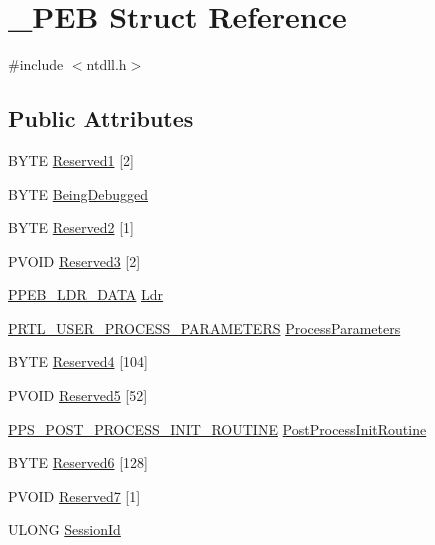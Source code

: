 \section{\-\_\-\-P\-E\-B Struct Reference}
\label{struct___p_e_b}


{\ttfamily \#include $<$ntdll.\-h$>$}

\subsection*{Public Attributes}
\begin{DoxyCompactItemize}
\item 
B\-Y\-T\-E \hyperlink{struct___p_e_b_af5f5296dcf3c0c893feb20369e5ee6ee}{Reserved1} \mbox{[}2\mbox{]}
\item 
B\-Y\-T\-E \hyperlink{struct___p_e_b_a6a1be595a75834747b84156ad490ac34}{Being\-Debugged}
\item 
B\-Y\-T\-E \hyperlink{struct___p_e_b_a631e09016e2625615dd0a4594fce4243}{Reserved2} \mbox{[}1\mbox{]}
\item 
P\-V\-O\-I\-D \hyperlink{struct___p_e_b_aa942177e7ede75e22d65547069f9fd65}{Reserved3} \mbox{[}2\mbox{]}
\item 
\hyperlink{ntdll_8h_a7199222ba5dc3b554125d875b4963b34}{P\-P\-E\-B\-\_\-\-L\-D\-R\-\_\-\-D\-A\-T\-A} \hyperlink{struct___p_e_b_a29c84508296ee2568339d06368fbaf70}{Ldr}
\item 
\hyperlink{ntdll_8h_aa9c2384887babd1a277b8e0ef36f0085}{P\-R\-T\-L\-\_\-\-U\-S\-E\-R\-\_\-\-P\-R\-O\-C\-E\-S\-S\-\_\-\-P\-A\-R\-A\-M\-E\-T\-E\-R\-S} \hyperlink{struct___p_e_b_a92dea8b624fff855a19206b16a642bc4}{Process\-Parameters}
\item 
B\-Y\-T\-E \hyperlink{struct___p_e_b_a981f5b2756598e2c4f5b90c94d686467}{Reserved4} \mbox{[}104\mbox{]}
\item 
P\-V\-O\-I\-D \hyperlink{struct___p_e_b_a1a2f1fdc366fd4e789973c4e179a09b3}{Reserved5} \mbox{[}52\mbox{]}
\item 
\hyperlink{ntdll_8h_a13137c7f924f59dd5a3fc43d84741eab}{P\-P\-S\-\_\-\-P\-O\-S\-T\-\_\-\-P\-R\-O\-C\-E\-S\-S\-\_\-\-I\-N\-I\-T\-\_\-\-R\-O\-U\-T\-I\-N\-E} \hyperlink{struct___p_e_b_abfdef1da281c1ee5272ec30ff69e7659}{Post\-Process\-Init\-Routine}
\item 
B\-Y\-T\-E \hyperlink{struct___p_e_b_a420ed9882740a6a377388a1a6af9eeba}{Reserved6} \mbox{[}128\mbox{]}
\item 
P\-V\-O\-I\-D \hyperlink{struct___p_e_b_a7609ed3d0fa1eb20494eee82712fbd9b}{Reserved7} \mbox{[}1\mbox{]}
\item 
U\-L\-O\-N\-G \hyperlink{struct___p_e_b_a72839780d4b76efe8132a010cde3e4a6}{Session\-Id}
\end{DoxyCompactItemize}



